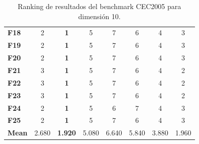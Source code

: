 \begin{table}
{\begin{tabular}{lccccccc}
		\textbf{F18}  &      2 &      \textbf{1} &      5 &      7 &      6 &      4 &      3 \\
		\textbf{F19}  &      2 &      \textbf{1} &      5 &      7 &      6 &      4 &      3 \\
		\textbf{F20}  &      2 &      \textbf{1} &      5 &      7 &      6 &      4 &      3 \\
		\textbf{F21}  &      3 &      \textbf{1} &      5 &      7 &      6 &      4 &      2 \\
		\textbf{F22}  &      3 &      \textbf{1} &      5 &      7 &      6 &      4 &      2 \\
		\textbf{F23}  &      3 &      \textbf{1} &      5 &      7 &      6 &      4 &      2 \\
		\textbf{F24}  &      2 &      \textbf{1} &      5 &      6 &      7 &      4 &      3 \\
		\textbf{F25}  &      2 &      \textbf{1} &      5 &      7 &      6 &      4 &      3 \\
		\midrule
		\textbf{Mean} &  2.680 &  \textbf{1.920} &  5.080 &  6.640 &  5.840 &  3.880 &  1.960 \\
		\bottomrule
	\end{tabular}}
	\caption{Ranking de resultados del benchmark CEC2005 para dimensión 10.}
\end{table}

